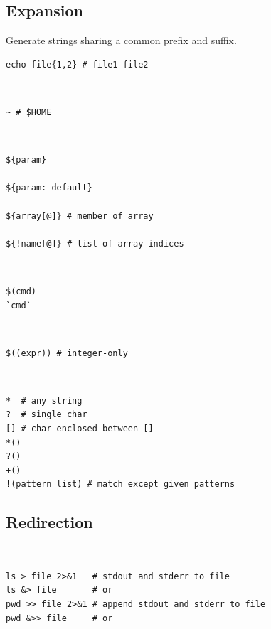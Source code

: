 \documentclass{blog}
\begin{document}
\subsection{Expansion}
\begin{definition}
    Generate strings sharing a common prefix and suffix.
    \begin{verbatim}
echo file{1,2} # file1 file2
\end{verbatim}
\end{definition}

\begin{definition}~
    \begin{verbatim}
~ # $HOME
\end{verbatim}
\end{definition}

\begin{definition}~
    \begin{verbatim}
${param}

${param:-default}

${array[@]} # member of array

${!name[@]} # list of array indices
\end{verbatim}
\end{definition}

\begin{definition}~
    \begin{verbatim}
$(cmd)
`cmd`
\end{verbatim}
\end{definition}

\begin{definition}~
    \begin{verbatim}
$((expr)) # integer-only
\end{verbatim}
\end{definition}

\begin{definition}~
    \begin{verbatim}
*  # any string
?  # single char
[] # char enclosed between []
*()
?()
+()
!(pattern list) # match except given patterns
\end{verbatim}
\end{definition}

\subsection{Redirection}
\begin{definition}[redirection]~
    \begin{verbatim}
ls > file 2>&1   # stdout and stderr to file
ls &> file       # or
pwd >> file 2>&1 # append stdout and stderr to file
pwd &>> file     # or
\end{verbatim}
\end{definition}
\end{document}
